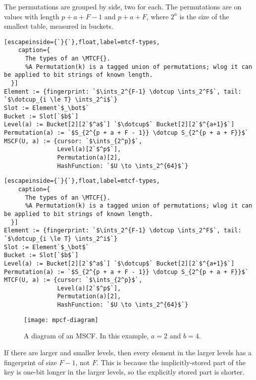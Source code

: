 \documentclass[letterpaper,twocolumn,10pt]{article}
\newcommand{\ints}{\mathbb{Z}}
\newcommand{\dotcup}{\ensuremath{\mathaccent\cdot\cup}}
\newcommand{\MTCF}{MSCF}
\newcommand{\MTCF}{MTCF}
\begin{document}
The permutations are grouped by side, two for each.
The permutations are on values with length $p + a + F - 1$ and $p + a + F$, where $2^a$ is the size of the smallest table, measured in buckets.

\ifanon
\begin{lstlisting}[escapeinside={`}{`},float,label=mtcf-types,
    caption={
      The types of an \MTCF{}.
      %A Permutation(k) is a tagged union of permutations; wlog it can be applied to bit strings of known length.
  }]
Element := {fingerprint: `$\ints_2^{F-1} \dotcup \ints_2^F$`, tail: `$\dotcup_{i \le T} \ints_2^i$`}
Slot := Element`$_\bot$`
Bucket := Slot[`$b$`]
Level(a) := Bucket[2][2`$^a$`] `$\dotcup$` Bucket[2][2`$^{a+1}$`]
Permutation(a) := `$S_{2^{p + a + F - 1}} \dotcup S_{2^{p + a + F}}$`
MSCF(U, a) := {cursor: `$\ints_{2^p}$`,
               Level(a)[2`$^p$`],
               Permutation(a)[2],
               HashFunction: `$U \to \ints_2^{64}$`}
\end{lstlisting}
\else
\begin{lstlisting}[escapeinside={`}{`},float,label=mtcf-types,
    caption={
      The types of an \MTCF{}.
      %A Permutation(k) is a tagged union of permutations; wlog it can be applied to bit strings of known length.
  }]
Element := {fingerprint: `$\ints_2^{F-1} \dotcup \ints_2^F$`, tail: `$\dotcup_{i \le T} \ints_2^i$`}
Slot := Element`$_\bot$`
Bucket := Slot[`$b$`]
Level(a) := Bucket[2][2`$^a$`] `$\dotcup$` Bucket[2][2`$^{a+1}$`]
Permutation(a) := `$S_{2^{p + a + F - 1}} \dotcup S_{2^{p + a + F}}$`
MTCF(U, a) := {cursor: `$\ints_{2^p}$`,
               Level(a)[2`$^p$`],
               Permutation(a)[2],
               HashFunction: `$U \to \ints_2^{64}$`}
\end{lstlisting}
\fi

\begin{figure}[b!]
  \texttt{[image: mpcf-diagram]}
\caption{\label{mtcf-diagram}
A diagram of an \MTCF{}.
In this example, $a = 2$ and $b=4$.
}
\end{figure}

If there are larger and smaller levels, then every element in the larger levels has a fingerprint of size $F-1$, not $F$.
This is because the implicitly-stored part of the key is one-bit longer in the larger levels, so the explicitly stored part is shorter.
\end{document}
